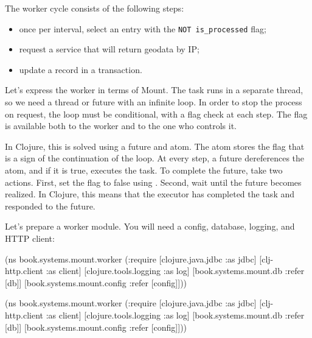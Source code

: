 The worker cycle consists of the following steps:

\begin{itemize}

\item
  once per interval, select an entry with the \verb|NOT is_processed| flag;

\item
  request a service that will return geodata by IP;

\item
  update a record in a transaction.

\end{itemize}

Let's express the worker in terms of Mount. The task runs in a separate thread, so we need a thread or future with an infinite loop. In order to stop the process on request, the loop must be conditional, with a flag check at each step. The flag is available both to the worker and to the one who controls it.


In Clojure, this is solved using a future and atom. The atom stores the flag that is a sign of the continuation of the loop. At every step, a future dereferences the atom, and if it is true, executes the task. To complete the future, take two actions. First, set the flag to false using . Second, wait until the future becomes realized. In Clojure, this means that the executor has completed the task and responded to the future.

Let's prepare a worker module. You will need a config, database, logging, and HTTP client:

\ifnarrow

\begin{english}
  \begin{clojure}
(ns book.systems.mount.worker
  (:require
   [clojure.java.jdbc :as jdbc]
   [clj-http.client :as client]
   [clojure.tools.logging :as log]
   [book.systems.mount.db :refer [db]]
   [book.systems.mount.config
    :refer [config]]))
  \end{clojure}
\end{english}

\else

\begin{english}
  \begin{clojure}
(ns book.systems.mount.worker
  (:require
   [clojure.java.jdbc :as jdbc]
   [clj-http.client :as client]
   [clojure.tools.logging :as log]
   [book.systems.mount.db :refer [db]]
   [book.systems.mount.config :refer [config]]))
  \end{clojure}
\end{english}


